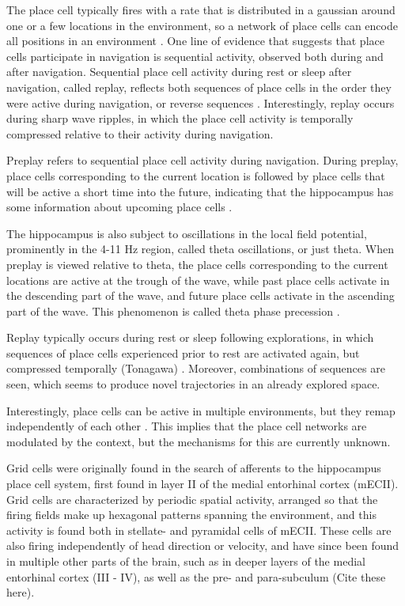 \documentclass{article}
\begin{document}
    The place cell typically fires with a rate that is distributed in a gaussian around one or a few locations in the environment, so a network of place cells can encode all positions in an environment \parencite{Wilson1993}.
    One line of evidence that suggests that place cells participate in navigation is sequential activity, observed both during and after navigation. Sequential place cell activity during rest or sleep after navigation, called replay, reflects both sequences of place cells in the order they were active during navigation, or reverse sequences \parencite{Wilson1994}. Interestingly, replay occurs during sharp wave ripples, in which the place cell activity is temporally compressed relative to their activity during navigation.

    Preplay refers to sequential place cell activity during navigation. During preplay, place cells corresponding to the current location is followed by place cells that will be active a short time into the future, indicating that the hippocampus has some information about upcoming place cells \parencite{Dragoi2011,Dragoi2013}.

    The hippocampus is also subject to oscillations in the local field potential, prominently in the 4-11 Hz region, called theta oscillations, or just theta. When preplay is viewed relative to theta, the place cells corresponding to the current locations are active at the trough of the wave, while past place cells activate in the descending part of the wave, and future place cells activate in the ascending part of the wave. This phenomenon is called theta phase precession \parencite{OKeefe1993, Skaggs1996,Hafting2008}.

    Replay typically occurs during rest or sleep following explorations, in which sequences of place cells experienced prior to rest are activated again, but compressed temporally (Tonagawa)\parencite{Olafsdottir2016} . Moreover, combinations of sequences are seen, which seems to produce novel trajectories in an already explored space.

    Interestingly, place cells can be active in multiple environments, but they remap independently of each other \parencite{Muller1987}. This implies that the place cell networks are modulated by the context, but the mechanisms for this are currently unknown.

    Grid cells were originally found in the search of afferents to the hippocampus place cell system, first found in layer II of the medial entorhinal cortex (mECII)\parencite{Hafting2005}. Grid cells are characterized by periodic spatial activity, arranged so that the firing fields make up hexagonal patterns spanning the environment, and this activity is found both in stellate- and pyramidal cells of mECII\parencite{Rowland2018}. These cells are also firing independently of head direction or velocity, and have since been found in multiple other parts of the brain, such as in deeper layers of the medial entorhinal cortex (III - IV), as well as the pre- and para-subculum (Cite these here).
\end{document}

